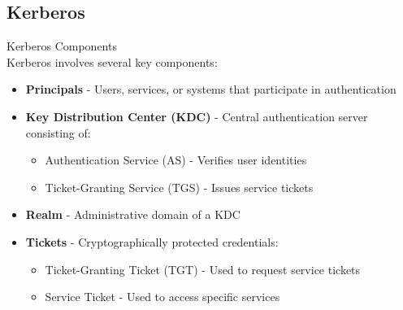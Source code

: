 \subsection{Kerberos}

\begin{concept}{Kerberos Components}\\
Kerberos involves several key components:
\begin{itemize}
    \item \textbf{Principals} - Users, services, or systems that participate in authentication
    \item \textbf{Key Distribution Center (KDC)} - Central authentication server consisting of:
    \begin{itemize}
        \item Authentication Service (AS) - Verifies user identities
        \item Ticket-Granting Service (TGS) - Issues service tickets
    \end{itemize}
    \item \textbf{Realm} - Administrative domain of a KDC
    \item \textbf{Tickets} - Cryptographically protected credentials:
    \begin{itemize}
        \item Ticket-Granting Ticket (TGT) - Used to request service tickets
        \item Service Ticket - Used to access specific services
    \end{itemize}
\end{itemize}
\end{concept}

